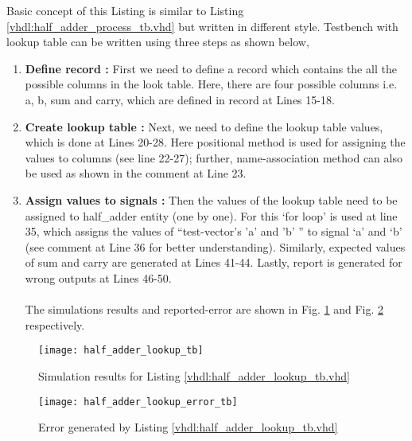 \begin{explanation}
	Basic concept of this Listing is similar to Listing \ref {vhdl:half_adder_process_tb.vhd} but written in different style. Testbench with lookup table can be  written using three steps as shown below, 
	
	\begin{enumerate}
		\item \textbf{Define record : } First we need to define a record which contains the all the possible columns in the look table. Here, there are four possible columns i.e. a, b, sum and carry, which are defined in record at Lines 15-18. 
		
		\item \textbf{Create lookup table : }  Next, we need to define the lookup table values, which is done at Lines 20-28. Here positional method is used for assigning the values to columns (see line 22-27); further, name-association method can also be used as shown in the comment at Line 23. 
		
		\item \textbf{Assign values to signals : } Then the values of the lookup table need to be assigned to half\_adder entity (one by one). For this `for loop' is used at line 35, which assigns the values of ``test-vector's 'a' and 'b' '' to signal `a' and `b' (see comment at Line 36 for better understanding). Similarly, expected values of sum and carry are generated at Lines 41-44. Lastly, report is generated for wrong outputs at Lines 46-50. 
		\\
		\\
		The simulations results and reported-error are shown in Fig. \ref{fig:half_adder_lookup_tb} and Fig. \ref{fig:half_adder_lookup_error_tb} respectively. 
	\end{enumerate}
\end{explanation}



\begin{figure}[!h]
	\centering
	\texttt{[image: half\_adder\_lookup\_tb]}
	\caption{Simulation results for Listing \ref{vhdl:half_adder_lookup_tb.vhd}}
	\label{fig:half_adder_lookup_tb}
\end{figure}

\begin{figure}[!h]
	\centering
	\texttt{[image: half\_adder\_lookup\_error\_tb]}
	\caption{Error generated by Listing \ref{vhdl:half_adder_lookup_tb.vhd}}
	\label{fig:half_adder_lookup_error_tb}
\end{figure}


